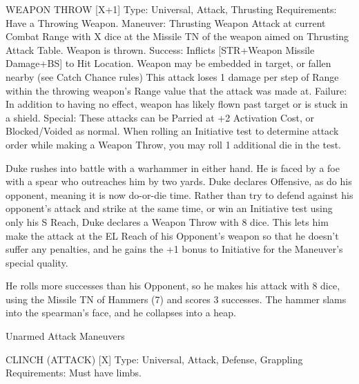 \documentclass[oneside,11pt,english]{book}
\begin{document}
WEAPON THROW [X+1] 
Type: Universal, Attack, Thrusting 
Requirements: Have a Throwing Weapon. 
Maneuver: Thrusting Weapon Attack at current Combat Range with X dice at the Missile TN of the 
weapon aimed on Thrusting Attack Table. Weapon is thrown. 
Success: Inflicts [STR+Weapon Missile Damage+BS] to Hit Location. Weapon may be embedded in 
target, or fallen nearby (see Catch Chance rules) This attack loses 1 damage per step of Range within the 
throwing weapon’s Range value that the attack was made at. 
Failure: In addition to having no effect, weapon has likely flown past target or is stuck in a shield. 
Special: These attacks can be Parried at +2 Activation Cost, or Blocked/Voided as normal. When rolling 
an Initiative test to determine attack order while making a Weapon Throw, you may roll 1 additional die 
in the test. 

 
Duke rushes into battle with a warhammer in either hand. He is faced by a foe with a spear who outreaches him by two yards. 
Duke declares Offensive, as do his opponent, meaning it is now do-or-die time. Rather than try to defend against his opponent’s 
attack and strike at the same time, or win an Initiative test using only his S Reach, Duke declares a Weapon Throw with 8 dice. 
This lets him make the attack at the EL Reach of his Opponent’s weapon so that he doesn’t suffer any penalties, and he gains the 
+1 bonus to Initiative for the Maneuver’s special quality. 

 
He rolls more successes than his Opponent, so he makes his attack with 8 dice, using the Missile TN of Hammers (7) and scores 3 
successes. The hammer slams into the spearman’s face, and he collapses into a heap. 

 

 

Unarmed Attack Maneuvers 

 

CLINCH (ATTACK) [X] 
Type: Universal, Attack, Defense, Grappling 
Requirements: Must have limbs. 
\end{document}
